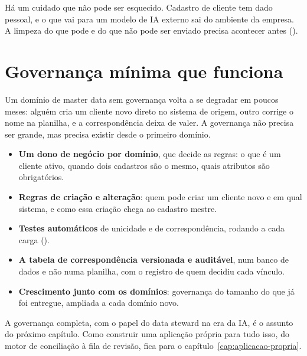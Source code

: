 Há um cuidado que não pode ser esquecido. Cadastro de cliente tem dado pessoal, e o que vai
para um modelo de IA externo sai do ambiente da empresa. A limpeza do que pode e do que não
pode ser enviado precisa acontecer antes ().

\section{Governança mínima que funciona}
\label{sec:governanca-master-data}

Um domínio de master data sem governança volta a se degradar em poucos meses: alguém cria
um cliente novo direto no sistema de origem, outro corrige o nome na planilha, e a
correspondência deixa de valer. A governança não precisa ser grande, mas precisa existir
desde o primeiro domínio.

\begin{itemize}
  \item \textbf{Um dono de negócio por domínio}, que decide as regras: o que é um cliente
    ativo, quando dois cadastros são o mesmo, quais atributos são obrigatórios.
  \item \textbf{Regras de criação e alteração}: quem pode criar um cliente novo e em qual
    sistema, e como essa criação chega ao cadastro mestre.
  \item \textbf{Testes automáticos} de unicidade e de correspondência, rodando a cada carga
    ().
  \item \textbf{A tabela de correspondência versionada e auditável}, num banco de dados e
    não numa planilha, com o registro de quem decidiu cada vínculo.
  \item \textbf{Crescimento junto com os domínios}: governança do tamanho do que já foi
    entregue, ampliada a cada domínio novo.
\end{itemize}

A governança completa, com o papel do data steward na era da IA, é o assunto do próximo
capítulo. Como construir uma aplicação própria para tudo isso, do motor de conciliação à
fila de revisão, fica para o capítulo~\ref{cap:aplicacao-propria}.

\begin{leituras}
\end{leituras}
